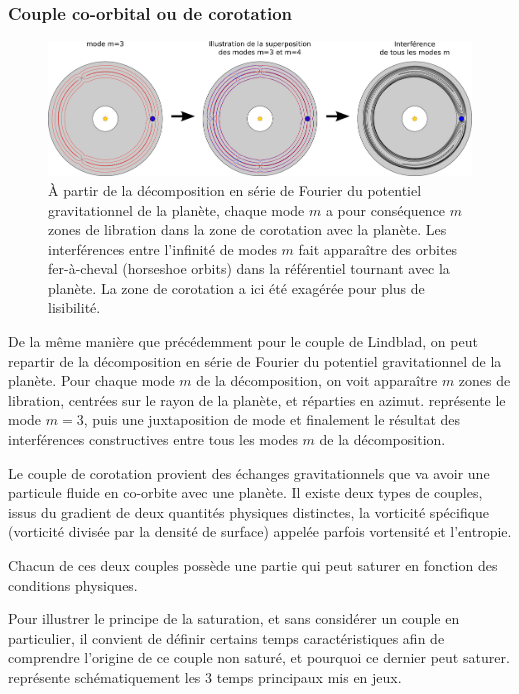 \subsubsection{Couple co-orbital ou de corotation}
\begin{figure}[htb]
\centering
\includegraphics[width=\linewidth]{figure/corotation_modes.pdf}
\caption{À partir de la décomposition en série de Fourier du potentiel gravitationnel de la planète, chaque mode $m$ a pour conséquence $m$ zones de libration dans la zone de corotation avec la planète. Les interférences entre l'infinité de modes $m$ fait apparaître des orbites fer-à-cheval (\og horseshoe orbits\fg) dans la référentiel tournant avec la planète. La zone de corotation a ici été exagérée pour plus de lisibilité.}\label{fig:corotation_torque}
\end{figure}

De la même manière que précédemment pour le couple de Lindblad, on peut repartir de la décomposition en série de Fourier du potentiel gravitationnel de la planète. Pour chaque mode $m$ de la décomposition, on voit apparaître $m$ zones de libration, centrées sur le rayon de la planète, et réparties en azimut.  représente le mode $m=3$, puis une juxtaposition de mode et finalement le résultat des interférences constructives entre tous les modes $m$ de la décomposition.


Le couple de corotation provient des échanges gravitationnels que va avoir une particule fluide en co-orbite avec une planète. Il existe deux types de couples, issus du gradient de deux quantités physiques distinctes, la vorticité spécifique (vorticité divisée par la densité de surface) appelée parfois vortensité et l'entropie. 

Chacun de ces deux couples possède une partie qui peut saturer en fonction des conditions physiques. 

Pour illustrer le principe de la saturation, et sans considérer un couple en particulier, il convient de définir certains temps caractéristiques afin de comprendre l'origine de ce couple non saturé, et pourquoi ce dernier peut saturer.  représente schématiquement les 3 temps principaux mis en jeux. 

